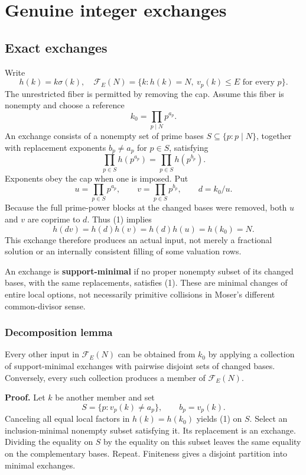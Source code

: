 \chapter{Genuine integer exchanges}\label{ch:exchanges}
\section{Exact exchanges}\label{exchange:exact-exchanges}

Write \[
h(k)=k\sigma(k),\quad \mathcal F_E(N)=\{k:h(k)=N,\ v_p(k)\le E\text{ for every }p\}.
\] The unrestricted fiber is permitted by removing the cap. Assume this fiber is nonempty and choose a reference \[
k_0=\prod_{p\mid N}p^{a_p}.
\] An exchange consists of a nonempty set of prime bases \(S\subseteq\{p:p\mid N\}\), together with replacement exponents \(b_p\ne a_p\) for \(p\in S\), satisfying \[
\boxed{\prod_{p\in S}h(p^{a_p})=\prod_{p\in S}h(p^{b_p}).}\tag{1}
\] Exponents obey the cap when one is imposed. Put \[
u=\prod_{p\in S}p^{a_p},\qquad v=\prod_{p\in S}p^{b_p},\qquad d=k_0/u.
\] Because the full prime-power blocks at the changed bases were removed, both \(u\) and \(v\) are coprime to \(d\). Thus (1) implies \[
h(dv)=h(d)h(v)=h(d)h(u)=h(k_0)=N.
\] This exchange therefore produces an actual input, not merely a fractional solution or an internally consistent filling of some valuation rows.

An exchange is \textbf{support-minimal} if no proper nonempty subset of its changed bases, with the same replacements, satisfies (1). These are minimal changes of entire local options, not necessarily primitive collisions in Moser's different common-divisor sense.

\subsection{Decomposition lemma}\label{exchange:decomposition-lemma}

Every other input in \(\mathcal F_E(N)\) can be obtained from \(k_0\) by applying a collection of support-minimal exchanges with pairwise disjoint sets of changed bases. Conversely, every such collection produces a member of \(\mathcal F_E(N)\).

\textbf{Proof.} Let \(k\) be another member and set \[
S=\{p:v_p(k)\ne a_p\},\qquad b_p=v_p(k).
\] Canceling all equal local factors in \(h(k)=h(k_0)\) yields (1) on \(S\). Select an inclusion-minimal nonempty subset satisfying it. Its replacement is an exchange. Dividing the equality on \(S\) by the equality on this subset leaves the same equality on the complementary bases. Repeat. Finiteness gives a disjoint partition into minimal exchanges.

